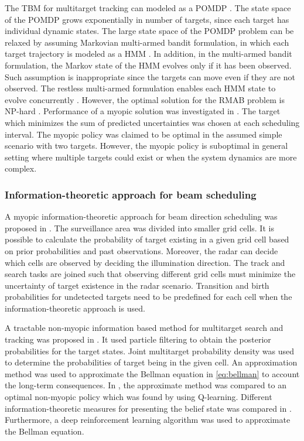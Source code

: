\documentclass[english, 12pt, a4paper, elec, utf8, a-1b, online]{aaltothesis}
\begin{document}
The TBM for multitarget tracking can modeled as a POMDP \cite{Krishnamurthy1999, Krishnamurthy2001, LaScala2006}.
The state space of the POMDP grows exponentially in number of targets, since each target has individual dynamic states.
The large state space of the POMDP problem can be relaxed by assuming Markovian multi-armed bandit formulation, in which each target trajectory is modeled as a HMM \cite{Krishnamurthy1999, Krishnamurthy2001}.
In addition, in the multi-armed bandit formulation, the Markov state of the HMM evolves only if it has been observed.
Such assumption is inappropriate since the targets can move even if they are not observed.
The restless multi-armed formulation enables each HMM state to evolve concurrently \cite{Scala2006}.
However, the optimal solution for the RMAB problem is NP-hard \cite{Guha2007}.
Performance of a myopic solution was investigated in \cite{Scala2006}.
The target which minimizes the sum of predicted uncertainties was chosen at each scheduling interval.
The myopic policy was claimed to be optimal in the assumed simple scenario with two targets.
However, the myopic policy is suboptimal in general setting where multiple targets could exist or when the system dynamics are more complex.

\subsubsection{Information-theoretic approach for beam scheduling} \label{sec:inf_based}

A myopic information-theoretic approach for beam direction scheduling was proposed in \cite{Kastella1997}.
The surveillance area was divided into smaller grid cells.
It is possible to calculate the probability of target existing in a given grid cell based on prior probabilities and past observations. 
Moreover, the radar can decide which cells are observed by deciding the illumination direction.
The track and search tasks are joined such that observing different grid cells must minimize the uncertainty of target existence in the radar scenario.
Transition and birth probabilities for undetected targets need to be predefined for each cell when the information-theoretic approach is used.

A tractable non-myopic information based method for multitarget search and tracking was proposed in \cite{Kreucher2004}.
It used particle filtering to obtain the posterior probabilities for the target states.
Joint multitarget probability density was used to determine the probabilities of target being in the given cell.
An approximation method was used to approximate the Bellman equation in \eqref{eq:bellman} to account the long-term consequences. 
In \cite{Kreucher2005}, the approximate method was compared to an optimal non-myopic policy which was found by using Q-learning.
Different information-theoretic measures for presenting the belief state was compared in \cite{Xu2010}.
Furthermore, a deep reinforcement learning algorithm was used to approximate the Bellman equation.
\end{document}

